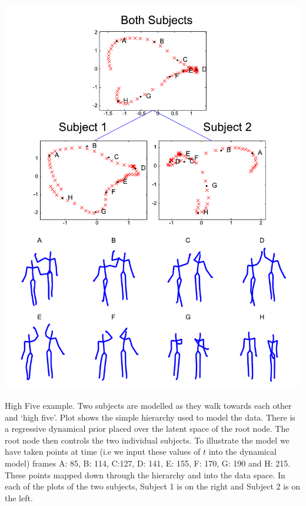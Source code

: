 \documentclass[english,color,smalltitle]{manchesterposter}
\begin{document}
\begin{multicols}{5}{\LARGE \par}
\begin{columnbox}
%
\begin{minipage}[c][1\totalheight][t]{1\columnwidth}%
\begin{center}
\includegraphics[width=1\columnwidth]{./diagrams/demHighFive_icml}
\par\end{center}{\LARGE \par}

\small High Five example. Two subjects are modelled as they walk
towards each other and `high five'. Plot shows the simple hierarchy
used to model the data. There is a regressive dynamical prior placed
over the latent space of the root node. The root node then controls
the two individual subjects. To illustrate the model we have taken
points at time (i.e we input these values of $t$ into the dynamical
model) frames A: 85, B: 114, C:127, D: 141, E: 155, F: 170, G: 190
and H: 215. These points mapped down through the hierarchy and into
the data space. In each of the plots of the two subjects, Subject
1 is on the right and Subject 2 is on the left. \label{fig:highFive}%
\end{minipage}{\large \par}


\end{columnbox}
\end{multicols}
\end{document}
